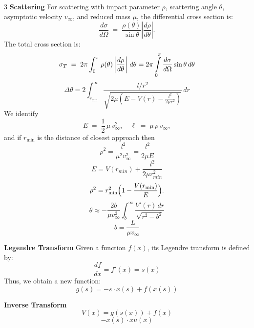 \documentclass[1pt]{article}
\begin{document}
\begin{multicols}{3}
\textbf{Scattering}
For scattering with impact parameter \(\rho\), scattering angle \(\theta\), asymptotic velocity \(v_\infty\), and reduced mass \(\mu\), the differential cross section is:
\begin{equation*}
    \frac{d\sigma}{d\Omega}
    \;=\;
    \frac{\rho(\theta)}{\sin \theta}
    \left|\frac{d\rho}{d\theta}\right|.
\end{equation*}
The total cross section is:
\begin{equation*}
    \sigma_{T}
    \;=\;
    2\pi \int_{0}^{\pi}
    \rho(\theta)
    \left|\frac{d\rho}{d\theta}\right|
    \,d\theta
    =2\pi\intop_{0}^{\pi}\frac{d\sigma}{d\Omega}\sin\theta\, d\theta
\end{equation*}
\[
\Delta \theta = 2 \int_{r_{\min}}^{\infty} \frac{l / r^2}{\sqrt{2\mu \left( E - V(r) - \frac{l^2}{2\mu r^2} \right)}} \, dr
\]
We identify
\[
E \;=\; \frac{1}{2}\,\mu\,v_{\infty}^{2}, \quad
\ell \;=\; \mu\,\rho\,v_{\infty},
\]
and if \(r_{\min}\) is the distance of closest approach then
\[
\rho^2=\frac{l^2}{\mu^2v_{\infty}^{2}}=\frac{l^2}{2\mu E}
\]
\[
E=V\left(r_{min}\right)+\frac{l^{2}}{2\mu r_{min}^{2}}
\]
\[
\rho^{2} = r_{\min}^{2}\Bigl(1 - \frac{V(r_{\min})}{E}\Bigr).
\]
\begin{equation*}
    \theta \approx - \frac{2b}{\mu v_\infty^2} \int_b^\infty \frac{V'(r)\, dr}{\sqrt{r^2 - b^2}}
\end{equation*}
\begin{equation*}
    b = \frac{L}{\mu v_\infty}
\end{equation*}


\textbf{Legendre Transform}
Given a function \( f(x) \), its Legendre transform is defined by:
\begin{equation*}
    \frac{df}{dx} = f'(x) = s(x)
\end{equation*}
Thus, we obtain a new function:
\begin{equation*}
    g(s) = -s\cdot x(s) + f(x(s))
\end{equation*}

\textbf{Inverse Transform}
\begin{equation*}
    V(x) = g(s(x)) + f(x)
\end{equation*}
\begin{equation*}
    -x(s) \cdot xu(x)
\end{equation*}


\end{multicols}
\end{document}
